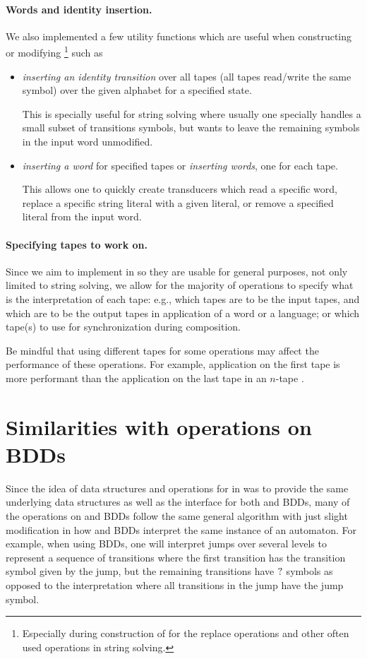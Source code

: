 \paragraph{Words and identity insertion.}
We also implemented a few utility functions which are useful when constructing or modifying \nfts\footnote{Especially during construction of \nfts for the replace operations and other often used operations in string solving.} such as
\begin{itemize}
  \item \emph{inserting an identity transition} over all tapes (all tapes read/write the same symbol) over the given alphabet for a specified state.

  This is specially useful for string solving where usually one specially handles a small subset of transitions symbols, but wants to leave the remaining symbols in the input word unmodified.

  \item \emph{inserting a word} for specified tapes or \emph{inserting words}, one for each tape.

  This allows one to quickly create transducers which read a specific word, replace a specific string literal with a given literal, or remove a specified literal from the input word.
\end{itemize}

\paragraph{Specifying tapes to work on.}
Since we aim to implement \nfts in \mata so they are usable for general purposes, not only limited to string solving, we allow for the majority of operations to specify what is the interpretation of each tape: e.g., which tapes are to be the input tapes, and which are to be the output tapes in application of a word or a language; or which tape(s) to use for synchronization during composition.

Be mindful that using different tapes for some operations may affect the performance of these operations. For example, application on the first tape is more performant than the application on the last tape in an $n$-tape \nft.

\section{Similarities with operations on BDDs}
Since the idea of data structures and operations for \nfts in \mata was to provide the same underlying data structures as well as the interface for both \nfts and BDDs, many of the operations on \nfts and BDDs follow the same general algorithm with just slight modification in how \nfts and BDDs interpret the same instance of an \nft automaton.
For example, when using BDDs, one will interpret jumps over several levels to represent a sequence of transitions where the first transition has the transition symbol given by the jump, but the remaining transitions have $?$ symbols as opposed to the \nft interpretation where all transitions in the jump have the jump symbol.

